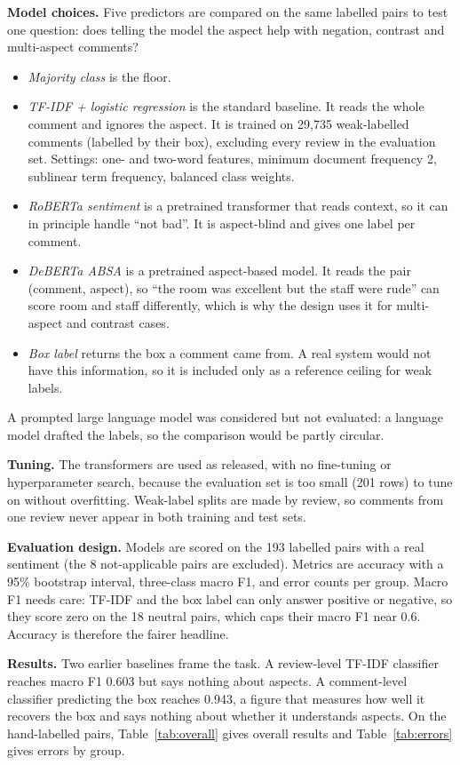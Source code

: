 \documentclass[11pt,a4paper]{article}
\begin{document}
\textbf{Model choices.} Five predictors are compared on the same labelled pairs to test one question: does telling the model the aspect help with negation, contrast and multi-aspect comments?
\begin{itemize}[nosep]
  \item \emph{Majority class} is the floor.
  \item \emph{TF-IDF + logistic regression} is the standard baseline. It reads the whole comment and ignores the aspect. It is trained on 29,735 weak-labelled comments (labelled by their box), excluding every review in the evaluation set. Settings: one- and two-word features, minimum document frequency 2, sublinear term frequency, balanced class weights.
  \item \emph{RoBERTa sentiment} \cite{cardiff} is a pretrained transformer that reads context, so it can in principle handle ``not bad''. It is aspect-blind and gives one label per comment.
  \item \emph{DeBERTa ABSA} \cite{yangheng} is a pretrained aspect-based model. It reads the pair (comment, aspect), so ``the room was excellent but the staff were rude'' can score room and staff differently, which is why the design uses it for multi-aspect and contrast cases.
  \item \emph{Box label} returns the box a comment came from. A real system would not have this information, so it is included only as a reference ceiling for weak labels.
\end{itemize}
A prompted large language model was considered but not evaluated: a language model drafted the labels, so the comparison would be partly circular.

\textbf{Tuning.} The transformers are used as released, with no fine-tuning or hyperparameter search, because the evaluation set is too small (201 rows) to tune on without overfitting. Weak-label splits are made by review, so comments from one review never appear in both training and test sets.

\textbf{Evaluation design.} Models are scored on the 193 labelled pairs with a real sentiment (the 8 not-applicable pairs are excluded). Metrics are accuracy with a 95\% bootstrap interval, three-class macro F1, and error counts per group. Macro F1 needs care: TF-IDF and the box label can only answer positive or negative, so they score zero on the 18 neutral pairs, which caps their macro F1 near 0.6. Accuracy is therefore the fairer headline.

\textbf{Results.} Two earlier baselines frame the task. A review-level TF-IDF classifier reaches macro F1 0.603 but says nothing about aspects. A comment-level classifier predicting the box reaches 0.943, a figure that measures how well it recovers the box and says nothing about whether it understands aspects. On the hand-labelled pairs, Table~\ref{tab:overall} gives overall results and Table~\ref{tab:errors} gives errors by group.
\end{document}
